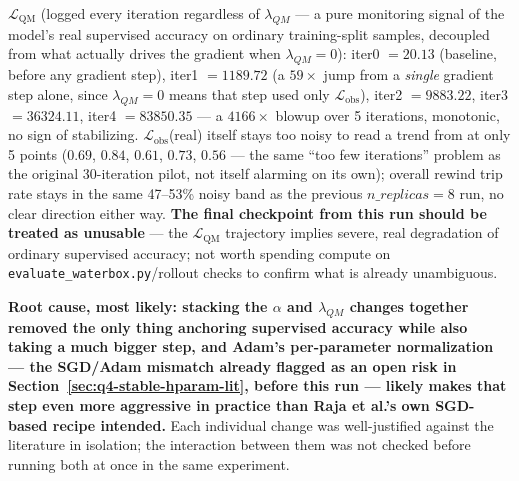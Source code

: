 \documentclass[11pt]{article}
\begin{document}
$\mathcal{L}_{\text{QM}}$ (logged every iteration regardless of
$\lambda_{QM}$ --- a pure monitoring signal of the model's real supervised
accuracy on ordinary training-split samples, decoupled from what actually
drives the gradient when $\lambda_{QM}=0$): iter0 $=20.13$ (baseline, before
any gradient step), iter1 $=1189.72$ (a $59\times$ jump from a
\emph{single} gradient step alone, since $\lambda_{QM}=0$ means that step
used only $\mathcal{L}_{\text{obs}}$), iter2 $=9883.22$, iter3
$=36324.11$, iter4 $=83850.35$ --- a $4166\times$ blowup over 5 iterations,
monotonic, no sign of stabilizing. $\mathcal{L}_{\text{obs}}$(real) itself
stays too noisy to read a trend from at only 5 points ($0.69$, $0.84$,
$0.61$, $0.73$, $0.56$ --- the same ``too few iterations'' problem as the
original 30-iteration pilot, not itself alarming on its own); overall
rewind trip rate stays in the same 47--53\% noisy band as the previous
$n\_replicas=8$ run, no clear direction either way. \textbf{The final
checkpoint from this run should be treated as unusable} --- the
$\mathcal{L}_{\text{QM}}$ trajectory implies severe, real degradation of
ordinary supervised accuracy; not worth spending compute on
\texttt{evaluate\_waterbox.py}/rollout checks to confirm what is already
unambiguous.

\textbf{Root cause, most likely: stacking the $\alpha$ and $\lambda_{QM}$
changes together removed the only thing anchoring supervised accuracy while
also taking a much bigger step, and Adam's per-parameter normalization ---
the SGD/Adam mismatch already flagged as an open risk in
Section~\ref{sec:q4-stable-hparam-lit}, before this run --- likely makes
that step even more aggressive in practice than Raja et al.'s own SGD-based
recipe intended.} Each individual change was well-justified against the
literature in isolation; the interaction between them was not checked
before running both at once in the same experiment.
\end{document}

